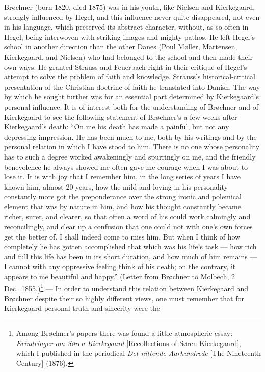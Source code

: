 \documentclass[12pt,a4paper]{book}
\newcommand{\opage}[1]{\marginnote{\footnotesize\textit{[#1]}}}
\begin{document}
Brøchner (born 1820, died 1875) was in his youth, like Nielsen and Kierkegaard, strongly
influenced by Hegel, and this influence never quite disappeared, not even in his language, which
preserved its abstract character, without, as so often in Hegel, being interwoven with striking
images and mighty pathos. He left Hegel's school in another direction than the other Danes (Poul
Møller, Martensen, Kierkegaard, and Nielsen) who had belonged to the school and then made their
own ways. He granted Strauss and Feuerbach right in their critique of Hegel's attempt to solve
the problem of faith and knowledge. Strauss's historical-critical presentation of the Christian
doctrine of faith he translated into Danish. The way by which he sought further was for an
essential part determined by Kierkegaard's \opage{198}personal influence. It is of interest both for the
understanding of Brøchner and of Kierkegaard to see the following statement of Brøchner's a few
weeks after Kierkegaard's death: ``On me his death has made a painful, but not any depressing
impression. He has been much to me, both by his writings and by the personal relation in which I
have stood to him. There is no one whose personality has to such a degree worked awakeningly and
spurringly on me, and the friendly benevolence he always showed me often gave me courage when I
was about to lose it. It is with joy that I remember him, in the long series of years I have
known him, almost 20 years, how the mild and loving in his personality constantly more got the
preponderance over the strong ironic and polemical element that was by nature in him, and how his
thought constantly became richer, surer, and clearer, so that often a word of his could work
calmingly and reconcilingly, and clear up a confusion that one could not with one's own forces
get the better of. I shall indeed come to miss him. But when I think of how completely he has
gotten accomplished that which was his life's task --- how rich and full this life has been in
its short duration, and how much of him remains --- I cannot with any oppressive feeling think of
his death; on the contrary, it appears to me beautiful and happy.'' (Letter from Brøchner to
Molbech, 2 Dec.\ 1855.)\footnote{Among Brøchner's papers there was found a little atmospheric
essay: \emph{Erindringer om Søren Kierkegaard} [Recollections of Søren Kierkegaard], which I
published in the periodical \emph{Det nittende Aarhundrede} [The Nineteenth Century] (1876).} ---
In order to understand this relation between Kierkegaard and Brøchner despite their so highly
different views, one must remember that for Kierkegaard personal truth and sincerity were the
\end{document}
